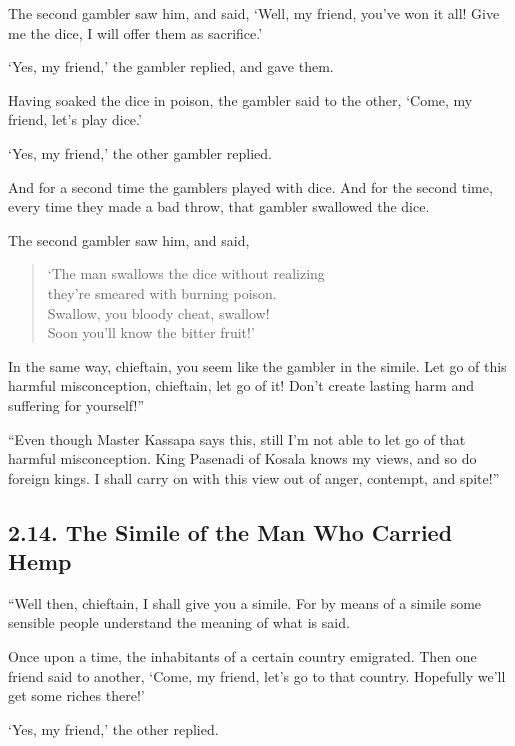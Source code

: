 \documentclass[12pt,openany]{book}%
\begin{document}
The second gambler saw him, and said, ‘Well, my friend, you’ve won it all! Give me the dice, I will offer them as sacrifice.’ 

‘Yes, my friend,’ the gambler replied, and gave them. 

Having soaked the dice in poison, the gambler said to the other, ‘Come, my friend, let’s play dice.’ 

‘Yes, my friend,’ the other gambler replied. 

And for a second time the gamblers played with dice. And for the second time, every time they made a bad throw, that gambler swallowed the dice. 

The second gambler saw him, and said, 

\begin{verse}%
‘The man swallows the dice without realizing \\
they’re smeared with burning poison. \\
Swallow, you bloody cheat, swallow! \\
Soon you’ll know the bitter fruit!’ 

%
\end{verse}

In the same way, chieftain, you seem like the gambler in the simile. Let go of this harmful misconception, chieftain, let go of it! Don’t create lasting harm and suffering for yourself!” 

“Even though Master Kassapa says this, still I’m not able to let go of that harmful misconception. King Pasenadi of Kosala knows my views, and so do foreign kings. I shall carry on with this view out of anger, contempt, and spite!” 

\subsection*{2.14. The Simile of the Man Who Carried Hemp }

“Well then, chieftain, I shall give you a simile. For by means of a simile some sensible people understand the meaning of what is said. 

Once upon a time, the inhabitants of a certain country emigrated. Then one friend said to another, ‘Come, my friend, let’s go to that country. Hopefully we’ll get some riches there!’ 

‘Yes, my friend,’ the other replied. 
\end{document}
